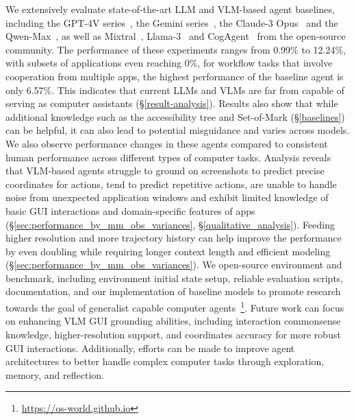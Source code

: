We extensively evaluate state-of-the-art LLM and VLM-based agent baselines, including the GPT-4V series~\citep{openai2023gpt}, the Gemini series~\citep{team2023gemini, reid2024gemini}, the Claude-3 Opus~\citep{claude3} and the Qwen-Max~\citep{bai2023qwen}, as well as Mixtral~\citep{jiang2024mixtral}, Llama-3~\citep{meta2024llama3} and CogAgent~\citep{hong2023cogagent} from the open-source community.
The performance of these experiments ranges from 0.99\% to 12.24\%, with subsets of applications even reaching 0\%,
for workflow tasks that involve cooperation from multiple apps, the highest performance of the baseline agent is only 6.57\%.
This indicates that current LLMs and VLMs are far from capable of serving as computer assistants (\S\ref{result-analysis}).
Results also show that while additional knowledge such as the accessibility tree and Set-of-Mark (\S\ref{baselines}) can be helpful, it can also lead to potential misguidance and varies across models.
We also observe performance changes in these agents compared to consistent human performance across different types of computer tasks.
Analysis reveals that VLM-based agents struggle to ground on screenshots to predict precise coordinates for actions, tend to predict repetitive actions, are unable to handle noise from unexpected application windows and exhibit limited knowledge of basic GUI interactions and domain-specific features of apps (\S\ref{sec:performance_by_mm_obs_variances}, \S\ref{qualitative_analysis}).
Feeding higher resolution and more trajectory history can help improve the performance by even doubling while requiring longer context length and efficient modeling (\S\ref{sec:performance_by_mm_obs_variances}).
We open-source \ours environment and benchmark, including environment initial state setup, reliable evaluation scripts, documentation, and our implementation of baseline models to promote research towards the goal of generalist capable computer agents~\footnote{\url{https://os-world.github.io}}.
Future work can focus on enhancing VLM GUI grounding abilities, including interaction commonsense knowledge, higher-resolution support, and coordinates accuracy for more robust GUI interactions. 
Additionally, efforts can be made to improve agent architectures to better handle complex computer tasks through exploration, memory, and reflection.

